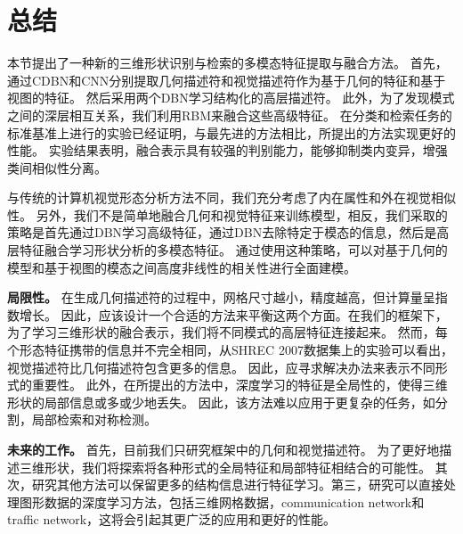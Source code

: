 \section{总结}
本节提出了一种新的三维形状识别与检索的多模态特征提取与融合方法。 首先，通过CDBN和CNN分别提取几何描述符和视觉描述符作为基于几何的特征和基于视图的特征。 然后采用两个DBN学习结构化的高层描述符。 此外，为了发现模式之间的深层相互关系，我们利用RBM来融合这些高级特征。 在分类和检索任务的标准基准上进行的实验已经证明，与最先进的方法相比，所提出的方法实现更好的性能。 实验结果表明，融合表示具有较强的判别能力，能够抑制类内变异，增强类间相似性分离。

与传统的计算机视觉形态分析方法不同，我们充分考虑了内在属性和外在视觉相似性。 另外，我们不是简单地融合几何和视觉特征来训练模型，相反，我们采取的策略是首先通过DBN学习高级特征，通过DBN去除特定于模态的信息，然后是高层特征融合学习形状分析的多模态特征。 通过使用这种策略，可以对基于几何的模型和基于视图的模态之间高度非线性的相关性进行全面建模。

\textbf{局限性。} 在生成几何描述符的过程中，网格尺寸越小，精度越高，但计算量呈指数增长。 因此，应该设计一个合适的方法来平衡这两个方面。在我们的框架下，为了学习三维形状的融合表示，我们将不同模式的高层特征连接起来。 然而，每个形态特征携带的信息并不完全相同，从SHREC 2007数据集上的实验可以看出，视觉描述符比几何描述符包含更多的信息。 因此，应寻求解决办法来表示不同形式的重要性。 此外，在所提出的方法中，深度学习的特征是全局性的，使得三维形状的局部信息或多或少地丢失。 因此，该方法难以应用于更复杂的任务，如分割，局部检索和对称检测。

\textbf {未来的工作。} 首先，目前我们只研究框架中的几何和视觉描述符。 为了更好地描述三维形状，我们将探索将各种形式的全局特征和局部特征相结合的可能性。 其次，研究其他方法可以保留更多的结构信息进行特征学习。第三，研究可以直接处理图形数据的深度学习方法，包括三维网格数据，communication network和traffic network，这将会引起其更广泛的应用和更好的性能。

